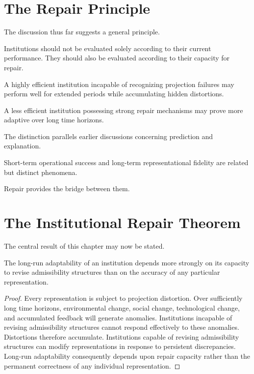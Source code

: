 \documentclass[11pt,oneside,openany]{book}
\begin{document}
\section{The Repair Principle}

The discussion thus far suggests a general principle.

Institutions should not be evaluated solely according to their current performance. They should also be evaluated according to their capacity for repair.

A highly efficient institution incapable of recognizing projection failures may perform well for extended periods while accumulating hidden distortions.

A less efficient institution possessing strong repair mechanisms may prove more adaptive over long time horizons.

The distinction parallels earlier discussions concerning prediction and explanation.

Short-term operational success and long-term representational fidelity are related but distinct phenomena.

Repair provides the bridge between them.

\section{The Institutional Repair Theorem}

The central result of this chapter may now be stated.

\begin{theorem}

The long-run adaptability of an institution depends more strongly on its capacity to revise admissibility structures than on the accuracy of any particular representation.

\end{theorem}

\begin{proof}

Every representation is subject to projection distortion. Over sufficiently long time horizons, environmental change, social change, technological change, and accumulated feedback will generate anomalies. Institutions incapable of revising admissibility structures cannot respond effectively to these anomalies. Distortions therefore accumulate. Institutions capable of revising admissibility structures can modify representations in response to persistent discrepancies. Long-run adaptability consequently depends upon repair capacity rather than the permanent correctness of any individual representation.

\end{proof}
\end{document}

